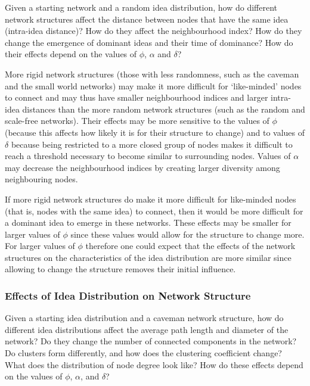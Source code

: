 Given a starting network and a random idea distribution, how do different network structures affect the distance between nodes that have the same idea (intra-idea distance)? How do they affect the neighbourhood index? How do they change the emergence of dominant ideas and their time of dominance? How do their effects depend on the values of $\phi$, $\alpha$ and $\delta$?


More rigid network structures (those with less randomness, such as the caveman and the small world networks) may make it more difficult for `like-minded' nodes to connect and may thus have smaller neighbourhood indices and larger intra-idea distances than the more random network structures (such as the random and scale-free networks). Their effects may be more sensitive to the values of $\phi$ (because this affects how likely it is for their structure to change) and to values of $\delta$ because being restricted to a more closed group of nodes makes it difficult to reach a threshold necessary to become similar to surrounding nodes. Values of $\alpha$ may decrease the neighbourhood indices by creating larger diversity among neighbouring nodes.

If more rigid network structures do make it more difficult for like-minded nodes (that is, nodes with the same idea) to connect, then it would be more difficult for a dominant idea to emerge in these networks. These effects may be smaller for larger values of $\phi$ since these values would allow for the structure to change more. For larger values of $\phi$ therefore one could expect that the effects of the network structures on the characteristics of the idea distribution are more similar since allowing to change the structure removes their initial influence.


\subsubsection{Effects of Idea Distribution on Network Structure}

Given a starting idea distribution and a caveman network structure, how do different idea distributions affect the average path length and diameter of the network? Do they change the number of connected components in the network? Do clusters form differently, and how does the clustering coefficient change? What does the distribution of node degree look like? How do these effects depend on the values of $\phi$, $\alpha$, and $\delta$?


